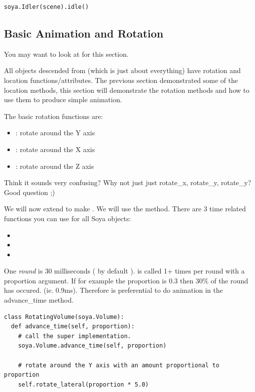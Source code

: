 \begin{verbatim}
soya.Idler(scene).idle()
\end{verbatim}

\subsection{Basic Animation and Rotation}

You may want to look at  for this section. 

All objects descended from  (which is just about 
everything) have rotation and location functions/attributes. The 
previous section demonstrated some of the location methods, this section
will demonstrate the rotation methods and how to use them to produce 
simple animation. 

The basic rotation functions are:
\begin{itemize}
  \item {}: rotate around the Y axis
  \item {}: rotate around the X axis
  \item {}: rotate around the Z axis
\end{itemize}

\begin{notice}
Think it sounds very confusing? Why not just just rotate_x, rotate_y, 
rotate_y? Good question ;)
\end{notice}

We will now extend  to make .
We will use the  method. There are 3 time related
functions you can use for all Soya objects:
\begin{itemize}
  \item {}
  \item {}
  \item {}
\end{itemize}

One \emph{round} is 30 milliseconds ( by default ). 
is called 1+ times per round with a proportion argument. If for 
example the proportion is 0.3 then 30\% of the round has occured. (ie.
0.9ms). Therefore is preferential to do animation in the advance_time 
method. 

\begin{verbatim}
class RotatingVolume(soya.Volume):
  def advance_time(self, proportion):
    # call the super implementation.
    soya.Volume.advance_time(self, proportion)

    # rotate around the Y axis with an amount proportional to proportion
    self.rotate_lateral(proportion * 5.0)
\end{verbatim}

